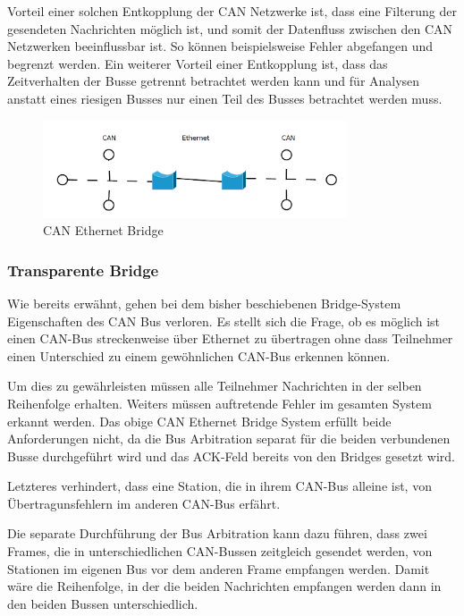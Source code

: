 Vorteil einer solchen Entkopplung der CAN Netzwerke ist, dass eine Filterung der gesendeten 
Nachrichten möglich ist, und somit der Datenfluss zwischen den CAN Netzwerken beeinflussbar 
ist. So können beispielsweise Fehler abgefangen und begrenzt werden. Ein weiterer Vorteil 
einer Entkopplung ist, dass das Zeitverhalten der Busse getrennt betrachtet werden kann 
und für Analysen anstatt eines riesigen Busses nur einen Teil des Busses betrachtet werden 
muss.

\begin{figure}[h] 
\centering
\includegraphics[width=0.8\textwidth]{figures/can_bridge}
\caption{CAN Ethernet Bridge} 
\label{bridge}
\end{figure}

\subsubsection{Transparente Bridge}
\label{l:trans}

Wie bereits erwähnt, gehen bei dem bisher beschiebenen Bridge-System Eigenschaften
des CAN Bus verloren. Es stellt sich die Frage, ob es möglich ist einen CAN-Bus
streckenweise über Ethernet zu übertragen ohne dass Teilnehmer einen Unterschied zu
einem gewöhnlichen CAN-Bus erkennen können.

Um dies zu gewährleisten müssen alle Teilnehmer Nachrichten in der selben Reihenfolge
erhalten. Weiters müssen auftretende Fehler im gesamten System erkannt werden. Das
obige CAN Ethernet Bridge System erfüllt beide Anforderungen nicht, da die Bus
Arbitration separat für die beiden verbundenen Busse durchgeführt wird und das
ACK-Feld bereits von den Bridges gesetzt wird.

Letzteres verhindert, dass eine Station, die in ihrem CAN-Bus alleine ist, von
Übertragunsfehlern im anderen CAN-Bus erfährt.

Die separate Durchführung der Bus Arbitration kann dazu führen, dass zwei Frames, die
in unterschiedlichen CAN-Bussen zeitgleich gesendet werden, von Stationen im eigenen
Bus vor dem anderen Frame empfangen werden. Damit wäre die Reihenfolge, in der die
beiden Nachrichten empfangen werden dann in den beiden Bussen unterschiedlich.

